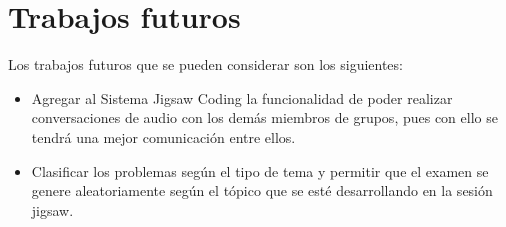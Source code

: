 \section{Trabajos futuros}
Los trabajos futuros que se pueden considerar son los siguientes:

\begin{itemize}
	\item Agregar al Sistema Jigsaw Coding la funcionalidad de poder realizar conversaciones de audio con los demás miembros de grupos, pues con ello se tendrá una mejor comunicación entre ellos.
	\item Clasificar los problemas según el tipo de tema y permitir que el examen se genere aleatoriamente según el tópico que se esté desarrollando en la sesión jigsaw.
\end{itemize}